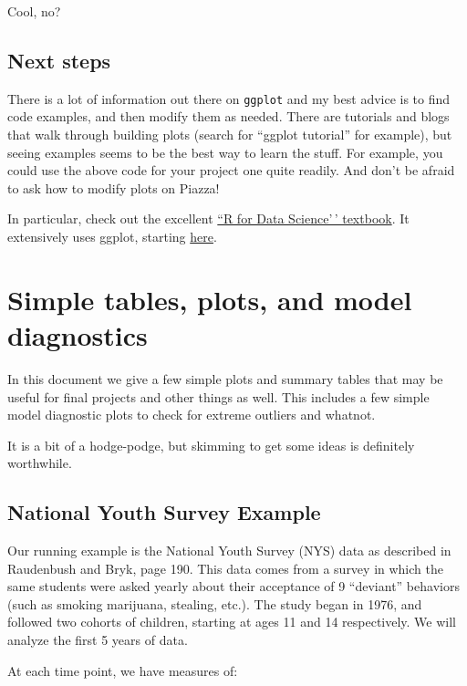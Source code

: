\documentclass[
  letterpaper,
  DIV=11,
  numbers=noendperiod]{scrreprt}
\begin{document}
Cool, no?

\hypertarget{next-steps}{%
\section{Next steps}\label{next-steps}}

There is a lot of information out there on \texttt{ggplot} and my best
advice is to find code examples, and then modify them as needed. There
are tutorials and blogs that walk through building plots (search for
``ggplot tutorial'' for example), but seeing examples seems to be the
best way to learn the stuff. For example, you could use the above code
for your project one quite readily. And don't be afraid to ask how to
modify plots on Piazza!

In particular, check out the excellent \href{http://r4ds.had.co.nz}{``R
for Data Science'\,' textbook}. It extensively uses ggplot, starting
\href{http://r4ds.had.co.nz/data-visualisation.html}{here}.

\hypertarget{simple-tables-plots-and-model-diagnostics}{%
\chapter{Simple tables, plots, and model
diagnostics}\label{simple-tables-plots-and-model-diagnostics}}

In this document we give a few simple plots and summary tables that may
be useful for final projects and other things as well. This includes a
few simple model diagnostic plots to check for extreme outliers and
whatnot.

It is a bit of a hodge-podge, but skimming to get some ideas is
definitely worthwhile.

\hypertarget{national-youth-survey-example}{%
\section{National Youth Survey
Example}\label{national-youth-survey-example}}

Our running example is the National Youth Survey (NYS) data as described
in Raudenbush and Bryk, page 190. This data comes from a survey in which
the same students were asked yearly about their acceptance of 9
``deviant'' behaviors (such as smoking marijuana, stealing, etc.). The
study began in 1976, and followed two cohorts of children, starting at
ages 11 and 14 respectively. We will analyze the first 5 years of data.

At each time point, we have measures of:
\end{document}
